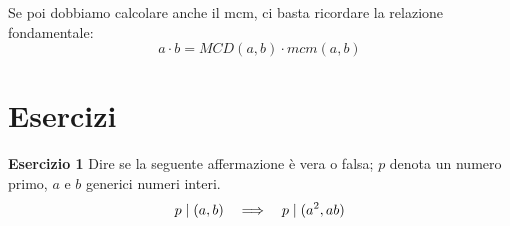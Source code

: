 Se poi dobbiamo calcolare anche il mcm, ci basta ricordare la relazione fondamentale:
\begin{equation*}
    a \cdot b = MCD(a, b) \cdot mcm(a, b)
\end{equation*}

\section{Esercizi}
\label{sec:esercizi_mcd}

\textbf{Esercizio 1}
Dire se la seguente affermazione è vera o falsa;
$p$ denota un numero primo, $a$ e $b$ generici numeri interi.
\begin{equation*}
    p  \mid  (a, b)  \quad\Longrightarrow\quad  p  \mid  (a^2, ab)
\end{equation*}